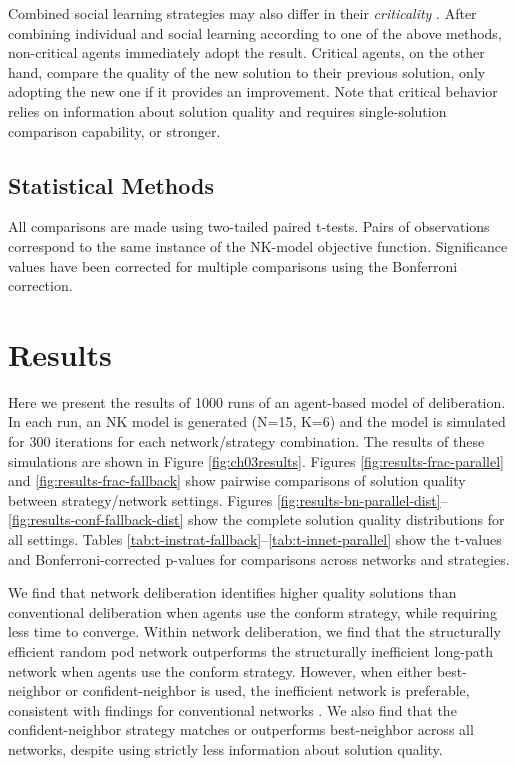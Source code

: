 Combined social learning strategies may also differ in their
{\em criticality} \cite{barkoczi_social_2016, rendell_rogersparadox_2010}.
After combining individual and social learning according to one of the above methods, non-critical agents immediately adopt the result.
Critical agents, on the other hand, compare the quality of the new solution to their previous solution, only adopting the new one if it provides an improvement.
Note that critical behavior relies on information about solution quality and requires single-solution comparison capability, or stronger.


\subsection{Statistical Methods}
All comparisons are made using two-tailed paired t-tests. Pairs of observations correspond to the same instance of the NK-model objective function.
Significance values have been corrected for multiple comparisons using the Bonferroni correction.

\section{Results}

Here we present the results of 1000 runs of an agent-based model of deliberation.
In each run, an NK model is generated (N=15, K=6) and the model is simulated for 300
iterations for each network/strategy combination.
The results of these simulations are shown in Figure \ref{fig:ch03results}.
Figures \ref{fig:results-frac-parallel} and \ref{fig:results-frac-fallback} show pairwise comparisons of solution quality between strategy/network settings. Figures \ref{fig:results-bn-parallel-dist}--\ref{fig:results-conf-fallback-dist} show the complete solution quality distributions for all settings.
Tables \ref{tab:t-instrat-fallback}--\ref{tab:t-innet-parallel} show the t-values and Bonferroni-corrected p-values for comparisons across networks and strategies.

We find that network deliberation identifies higher quality solutions than
conventional deliberation when agents use the conform strategy,
while requiring less time to converge. Within network deliberation,
we find that the structurally efficient random pod network outperforms the
structurally inefficient long-path network when agents use the conform strategy.
However, when either best-neighbor or confident-neighbor is used,
the inefficient network is preferable, consistent with findings for conventional
networks \cite{barkoczi_social_2016}. We also find that the confident-neighbor
strategy matches or outperforms best-neighbor across all networks,
despite using strictly less information about solution quality.


